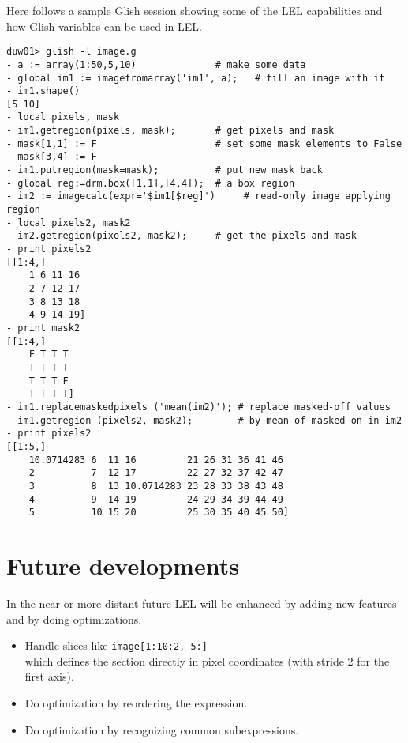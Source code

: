 Here follows a sample Glish session showing some of the LEL
capabilities and how Glish variables can be used in LEL.
\begin{verbatim}
duw01> glish -l image.g
- a := array(1:50,5,10)              # make some data
- global im1 := imagefromarray('im1', a);   # fill an image with it
- im1.shape()
[5 10]
- local pixels, mask
- im1.getregion(pixels, mask);       # get pixels and mask
- mask[1,1] := F                     # set some mask elements to False
- mask[3,4] := F
- im1.putregion(mask=mask);          # put new mask back
- global reg:=drm.box([1,1],[4,4]);  # a box region
- im2 := imagecalc(expr='$im1[$reg]')     # read-only image applying region
- local pixels2, mask2
- im2.getregion(pixels2, mask2);     # get the pixels and mask
- print pixels2
[[1:4,]
    1 6 11 16
    2 7 12 17
    3 8 13 18
    4 9 14 19] 
- print mask2
[[1:4,]
    F T T T
    T T T T
    T T T F
    T T T T] 
- im1.replacemaskedpixels ('mean(im2)'); # replace masked-off values
- im1.getregion (pixels2, mask2);        # by mean of masked-on in im2
- print pixels2
[[1:5,]
    10.0714283 6  11 16         21 26 31 36 41 46
    2          7  12 17         22 27 32 37 42 47
    3          8  13 10.0714283 23 28 33 38 43 48
    4          9  14 19         24 29 34 39 44 49
    5          10 15 20         25 30 35 40 45 50]
\end{verbatim}

\section{Future developments}
In the near or more distant future LEL will be enhanced by adding new
features and by doing optimizations.
\begin{itemize}
  \item Handle slices like \texttt{image[1:10:2, 5:]}
        \\which defines the section directly in pixel coordinates (with
        stride 2 for the first axis).
  \item Do optimization by reordering the expression.
  \item Do optimization by recognizing common subexpressions.
\end{itemize}
